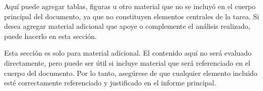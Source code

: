 Aquí puede agregar tablas, figuras u otro material que no se incluyó en el cuerpo principal del documento, ya que no constituyen elementos centrales de la tarea. Si desea agregar material adicional que apoye o complemente el análisis realizado, puede hacerlo en esta sección.

\begin{mdframed} 
    Esta sección es solo para material adicional. El contenido aquí no será evaluado directamente, pero puede ser útil si incluye material que será referenciado en el cuerpo del documento. Por lo tanto, asegúrese de que cualquier elemento incluido esté correctamente referenciado y justificado en el informe principal.
 \end{mdframed}


 